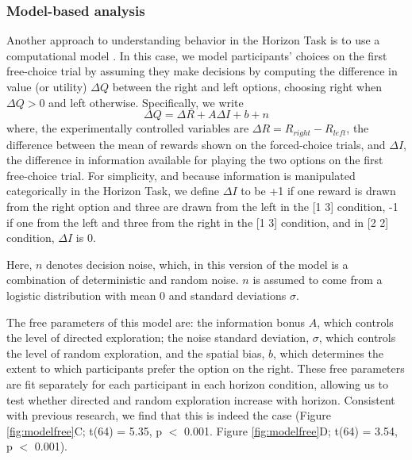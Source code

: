 \documentclass[12pt]{article}
\begin{document}
{	\subsubsection*{Model-based analysis}	
	Another approach to understanding behavior in the Horizon Task is to use a computational model \citep{wilson2014}. In this case, we model  participants' choices on the first free-choice trial by assuming they make decisions by computing the difference in value (or utility) $\Delta Q$ between the right and left options, choosing right when $\Delta Q > 0$ and left otherwise.  Specifically, we write
	\begin{equation}
		\label{eq:origmodel}
		\Delta Q= \Delta R+A \Delta I+b+n
	\end{equation}
	where, the experimentally controlled variables are $\Delta R=R_{right}-R_{left}$, the difference between the mean of rewards shown on the forced-choice trials, and $\Delta I$, the difference in information available for playing the two options on the first free-choice trial. For simplicity, and because information is manipulated categorically in the Horizon Task, we define $\Delta I$ to be +1 if one reward is drawn from the right option and three are drawn from the left in the [1 3] condition, -1 if one from the left and three from the right in the [1 3] condition, and in [2 2] condition, $\Delta I$ is 0. 
	
	Here, $n$ denotes decision noise, which, in this version of the model is a combination of deterministic and random noise. $n$ is assumed to come from a logistic distribution with mean 0 and standard deviations $\sigma$.
	
	The free parameters of this model are: the information bonus $A$, which controls the level of directed exploration; the noise standard deviation, $\sigma$, which controls the level of random exploration, and the spatial bias, $b$, which determines the extent to which participants prefer the option on the right. These free parameters are fit separately for each participant in each horizon condition, allowing us to test whether directed and random exploration increase with horizon. Consistent with previous research, we find that this is indeed the case (Figure \ref{fig:modelfree}C; t(64) = 5.35, p $<$ 0.001. Figure \ref{fig:modelfree}D; t(64) = 3.54, p $<$ 0.001). 
	
}
\end{document}
